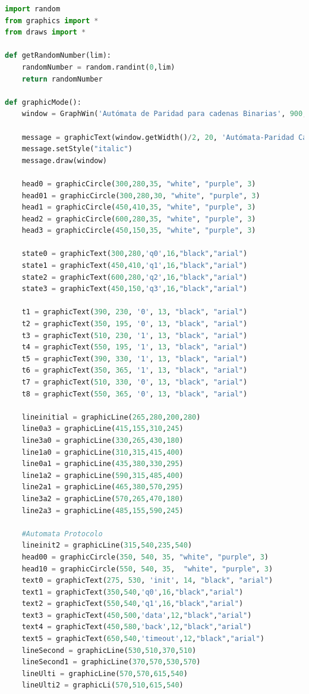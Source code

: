 \documentclass{article}
\begin{document}
\begin{lstlisting}[language=Python, caption=Librería que contiene las funciones de nuestra clase principal]
import random
from graphics import *
from draws import *

def getRandomNumber(lim):
    randomNumber = random.randint(0,lim)
    return randomNumber

def graphicMode():
    window = GraphWin('Autómata de Paridad para cadenas Binarias', 900, 1500) 

    message = graphicText(window.getWidth()/2, 20, 'Autómata-Paridad Cadenas Binarias', 24, "black", "courier")
    message.setStyle("italic")
    message.draw(window)

    head0 = graphicCircle(300,280,35, "white", "purple", 3)
    head01 = graphicCircle(300,280,30, "white", "purple", 3)
    head1 = graphicCircle(450,410,35, "white", "purple", 3)
    head2 = graphicCircle(600,280,35, "white", "purple", 3)
    head3 = graphicCircle(450,150,35, "white", "purple", 3)

    state0 = graphicText(300,280,'q0',16,"black","arial")
    state1 = graphicText(450,410,'q1',16,"black","arial")
    state2 = graphicText(600,280,'q2',16,"black","arial")
    state3 = graphicText(450,150,'q3',16,"black","arial")

    t1 = graphicText(390, 230, '0', 13, "black", "arial")
    t2 = graphicText(350, 195, '0', 13, "black", "arial")
    t3 = graphicText(510, 230, '1', 13, "black", "arial")
    t4 = graphicText(550, 195, '1', 13, "black", "arial")
    t5 = graphicText(390, 330, '1', 13, "black", "arial")
    t6 = graphicText(350, 365, '1', 13, "black", "arial")
    t7 = graphicText(510, 330, '0', 13, "black", "arial")
    t8 = graphicText(550, 365, '0', 13, "black", "arial")

    lineinitial = graphicLine(265,280,200,280)
    line0a3 = graphicLine(415,155,310,245)
    line3a0 = graphicLine(330,265,430,180)
    line1a0 = graphicLine(310,315,415,400)
    line0a1 = graphicLine(435,380,330,295)
    line1a2 = graphicLine(590,315,485,400)
    line2a1 = graphicLine(465,380,570,295)
    line3a2 = graphicLine(570,265,470,180)
    line2a3 = graphicLine(485,155,590,245)

    #Automata Protocolo
    lineinit2 = graphicLine(315,540,235,540)
    head00 = graphicCircle(350, 540, 35, "white", "purple", 3)
    head10 = graphicCircle(550, 540, 35,  "white", "purple", 3)
    text0 = graphicText(275, 530, 'init', 14, "black", "arial")
    text1 = graphicText(350,540,'q0',16,"black","arial")
    text2 = graphicText(550,540,'q1',16,"black","arial")
    text3 = graphicText(450,500,'data',12,"black","arial")
    text4 = graphicText(450,580,'back',12,"black","arial")
    text5 = graphicText(650,540,'timeout',12,"black","arial")
    lineSecond = graphicLine(530,510,370,510)
    lineSecond1 = graphicLine(370,570,530,570)
    lineUlti = graphicLine(570,570,615,540)
    lineUlti2 = graphicLi(570,510,615,540)


\end{lstlisting}
\end{document}

